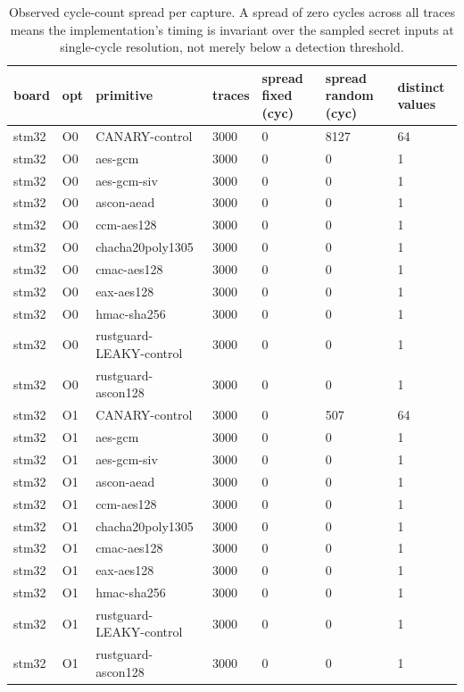 \begin{table}[t]
  \centering
  \caption{Observed cycle-count spread per capture. A spread of zero cycles across all traces means the implementation's timing is invariant over the sampled secret inputs at single-cycle resolution, not merely below a detection threshold.}
  \label{tab:resolutionkeyed}
  \begin{tabular}{lllllll}
    \toprule
    board & opt & primitive & traces & spread fixed (cyc) & spread random (cyc) & distinct values \\
    \midrule
    stm32 & O0 & CANARY-control & 3000 & 0 & 8127 & 64 \\
    stm32 & O0 & aes-gcm & 3000 & 0 & 0 & 1 \\
    stm32 & O0 & aes-gcm-siv & 3000 & 0 & 0 & 1 \\
    stm32 & O0 & ascon-aead & 3000 & 0 & 0 & 1 \\
    stm32 & O0 & ccm-aes128 & 3000 & 0 & 0 & 1 \\
    stm32 & O0 & chacha20poly1305 & 3000 & 0 & 0 & 1 \\
    stm32 & O0 & cmac-aes128 & 3000 & 0 & 0 & 1 \\
    stm32 & O0 & eax-aes128 & 3000 & 0 & 0 & 1 \\
    stm32 & O0 & hmac-sha256 & 3000 & 0 & 0 & 1 \\
    stm32 & O0 & rustguard-LEAKY-control & 3000 & 0 & 0 & 1 \\
    stm32 & O0 & rustguard-ascon128 & 3000 & 0 & 0 & 1 \\
    stm32 & O1 & CANARY-control & 3000 & 0 & 507 & 64 \\
    stm32 & O1 & aes-gcm & 3000 & 0 & 0 & 1 \\
    stm32 & O1 & aes-gcm-siv & 3000 & 0 & 0 & 1 \\
    stm32 & O1 & ascon-aead & 3000 & 0 & 0 & 1 \\
    stm32 & O1 & ccm-aes128 & 3000 & 0 & 0 & 1 \\
    stm32 & O1 & chacha20poly1305 & 3000 & 0 & 0 & 1 \\
    stm32 & O1 & cmac-aes128 & 3000 & 0 & 0 & 1 \\
    stm32 & O1 & eax-aes128 & 3000 & 0 & 0 & 1 \\
    stm32 & O1 & hmac-sha256 & 3000 & 0 & 0 & 1 \\
    stm32 & O1 & rustguard-LEAKY-control & 3000 & 0 & 0 & 1 \\
    stm32 & O1 & rustguard-ascon128 & 3000 & 0 & 0 & 1 \\

\end{tabular}
\end{table}
